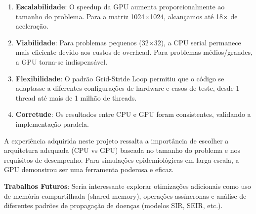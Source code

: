 \documentclass{article}
\begin{document}
\begin{enumerate}
    \item \textbf{Escalabilidade}: O speedup da GPU aumenta proporcionalmente ao tamanho do problema. Para a matriz 1024×1024, alcançamos até 18× de aceleração.
    
    \item \textbf{Viabilidade}: Para problemas pequenos (32×32), a CPU serial permanece mais eficiente devido aos custos de overhead. Para problemas médios/grandes, a GPU torna-se indispensável.
    
    \item \textbf{Flexibilidade}: O padrão Grid-Stride Loop permitiu que o código se adaptasse a diferentes configurações de hardware e casos de teste, desde 1 thread até mais de 1 milhão de threads.
    
    \item \textbf{Corretude}: Os resultados entre CPU e GPU foram consistentes, validando a implementação paralela.
\end{enumerate}

A experiência adquirida neste projeto ressalta a importância de escolher a arquitetura adequada (CPU vs GPU) baseada no tamanho do problema e nos requisitos de desempenho. Para simulações epidemiológicas em larga escala, a GPU demonstrou ser uma ferramenta poderosa e eficaz.

\textbf{Trabalhos Futuros}: Seria interessante explorar otimizações adicionais como uso de memória compartilhada (shared memory), operações assíncronas e análise de diferentes padrões de propagação de doenças (modelos SIR, SEIR, etc.).
\end{document}
